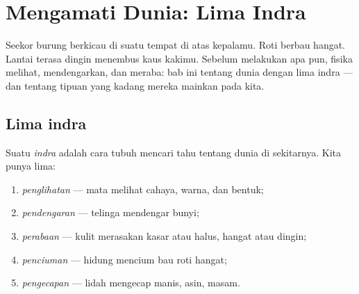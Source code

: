 \chapter{Mengamati Dunia: Lima Indra}\label{ch:g1:five-senses}

Seekor burung berkicau di suatu tempat di atas kepalamu. Roti berbau
hangat. Lantai terasa dingin menembus kaus kakimu. Sebelum melakukan
apa pun, fisika melihat, mendengarkan, dan meraba: bab ini tentang
 dunia dengan lima indra --- dan tentang tipuan yang kadang
mereka mainkan pada kita.

\section{Lima indra}

\begin{definition}\label{def:g1:five-senses:senses}
Suatu \emph{indra} adalah cara tubuh mencari tahu tentang
dunia di sekitarnya. Kita punya lima:
\begin{enumerate}
  \item \emph{penglihatan} --- mata melihat cahaya,
        warna, dan bentuk;
  \item \emph{pendengaran} --- telinga mendengar
        bunyi;
  \item \emph{perabaan} --- kulit merasakan kasar atau
        halus, hangat atau dingin;
  \item \emph{penciuman} --- hidung mencium bau roti
        hangat;
  \item \emph{pengecapan} --- lidah mengecap manis,
        asin, masam.
\end{enumerate}
\end{definition}

